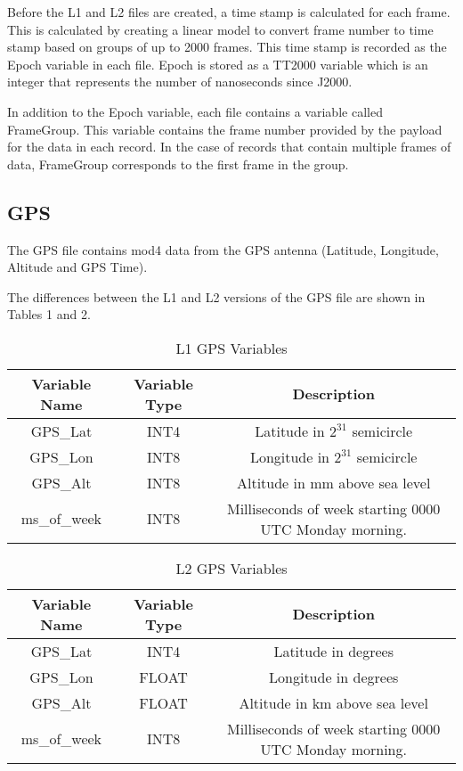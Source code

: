 \documentclass{article}
\begin{document}
Before the L1 and L2 files are created, a time stamp is calculated for each frame. This is calculated by creating a linear model to convert frame number to time stamp based on groups of up to 2000 frames. This time stamp is recorded as the Epoch variable in each file. Epoch is stored as a TT2000 variable which is an integer that represents the number of nanoseconds since J2000.

In addition to the Epoch variable, each file contains a variable called FrameGroup. This variable contains the frame number provided by the payload for the data in each record. In the case of records that contain multiple frames of data, FrameGroup corresponds to the first frame in the group.

\subsection{GPS}
The GPS file contains mod4 data from the GPS antenna (Latitude, Longitude, Altitude and GPS Time). 

The differences between the L1 and L2 versions of the GPS file are shown in Tables 1 and 2.

\begin{table}[H]
\caption{L1 GPS Variables}
\begin{tabular}{|c|c|c|}
\hline
Variable Name&Variable Type&Description\\ \hline
GPS\_Lat&INT4&Latitude in $2^{31}$ semicircle\\
GPS\_Lon&INT8&Longitude in $2^{31}$ semicircle\\
GPS\_Alt&INT8&Altitude in mm above sea level\\
ms\_of\_week&INT8 & Milliseconds of week starting 0000 UTC Monday morning.\\
\hline
\end{tabular}
\end{table}

\begin{table}[H]
\caption{L2 GPS Variables}
\begin{tabular}{|c|c|c|}
\hline
Variable Name&Variable Type&Description\\ \hline
GPS\_Lat&INT4&Latitude in degrees\\
GPS\_Lon&FLOAT&Longitude in degrees\\
GPS\_Alt&FLOAT&Altitude in km above sea level\\
ms\_of\_week&INT8 & Milliseconds of week starting 0000 UTC Monday morning.\\
\hline
\end{tabular}
\end{table}
\end{document}
